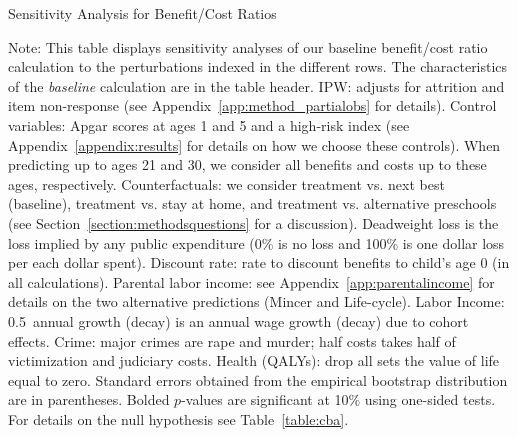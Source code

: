 \begin{table}
\begin{threeparttable}
\caption{Sensitivity Analysis for Benefit/Cost Ratios}
\label{table:bcsens}
\centering
\scriptsize

\begin{tablenotes}
\scriptsize
\item Note: This table displays sensitivity analyses of our baseline benefit/cost ratio calculation to the perturbations indexed in the different rows. The characteristics of the \textit{baseline} calculation are in the table header. IPW: adjusts for attrition and item non-response (see  Appendix~\ref{app:method_partialobs} for details). Control variables: Apgar scores at ages 1 and 5 and a high-risk index (see  Appendix~\ref{appendix:results} for details on how we choose these controls). When predicting up to ages 21 and 30, we consider all benefits and costs up to these ages, respectively. Counterfactuals: we consider treatment vs. next best (baseline), treatment vs. stay at home, and treatment vs. alternative preschools (see Section~\ref{section:methodsquestions} for a discussion). Deadweight loss is the loss implied by any public expenditure (0\% is no loss and 100\% is one dollar loss per each dollar spent). Discount rate: rate to discount benefits to child's age 0 (in all calculations). Parental labor income: see  Appendix~\ref{app:parentalincome} for details on the two alternative predictions (Mincer and Life-cycle). Labor Income: 0.5\ annual growth (decay) is an annual wage growth (decay) due to cohort effects. Crime: major crimes are rape and murder; half costs takes half of victimization and judiciary costs. Health (QALYs): drop all sets the value of life equal to zero. Standard errors obtained from the empirical bootstrap distribution are in parentheses. Bolded $p$-values are significant at 10\% using one-sided tests. For details on the null hypothesis see Table~\ref{table:cba}.
\end{tablenotes}
\end{threeparttable}
\end{table}

